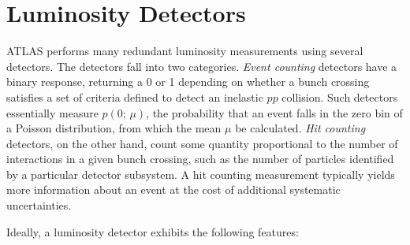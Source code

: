 \section{Luminosity Detectors}\label{sec:reco-luminosity-detectors}
ATLAS performs many redundant luminosity measurements using several detectors. The detectors fall into two categories. \emph{Event counting} detectors have a binary response, returning a 0 or 1 depending on whether a bunch crossing satisfies a set of criteria defined to detect an inelastic $pp$ collision. Such detectors essentially measure $p(0;\,\mu)$, the probability that an event falls in the zero bin of a Poisson distribution, from which the mean $\mu$ be calculated. \emph{Hit counting} detectors, on the other hand, count some quantity proportional to the number of interactions in a given bunch crossing, such as the number of particles identified by a particular detector subsystem. A hit counting measurement typically yields more information about an event at the cost of additional systematic uncertainties.

Ideally, a luminosity detector exhibits the following features: 

